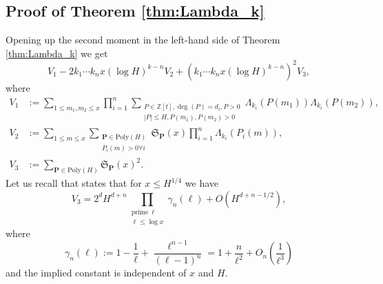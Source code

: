 \documentclass[reqno, 11pt]{amsart}
\numberwithin{equation}{section}
\theoremstyle{definition}
\newcommand{\0}{\mathbf{0}}
\renewcommand{\leq}{\leqslant}
\renewcommand{\leq}{\leqslant}
\renewcommand{\#}{\sharp}
\begin{document}
\subsection{Proof of Theorem \ref{thm:Lambda_k}} \label{proofmaintheorem} Opening up the second moment in the  left-hand side of 
Theorem \ref{thm:Lambda_k} we get \begin{equation}\label{eq:karotsaki} V_1-2k_1\cdots k_n x (\log H)^{k-n}    
V_2 +(k_1\cdots k_n x (\log H)^{k-n})^2 V_3 ,  \end{equation} where \begin{align*}
V_1& := \sum_{1\leq m_1,m_2\leq x } \prod_{i=1}^n  \sum_{\substack{P \in \mathbb Z[t], \deg(P)=d_i,P>0
 \\|P|\leq H, P(m_1),P(m_2)>0 }}  \Lambda_{k_i}(P(m_1)) \Lambda_{k_i}(P(m_2)), \\
V_2& :=  \sum_{1\leq m\leq x } \sum_{\substack{\mathbf P \in  \textrm{Poly}(H)
\\ P_i(m)>0 \forall i  }}  \mathfrak S_{\mathbf P }(x) \prod_{i=1}^n \Lambda_{k_i}(P_i(m)) , \\
V_3& := \sum_{\mathbf P \in  \textrm{Poly}(H)} \mathfrak S_{\mathbf P }(x)^2.\end{align*} 
Let us   recall that \cite[Lemma 4.7]{MR4542704} states that  for  $ x \leqslant H^{1/4}$ we have
\begin{equation}\label{lem:ch'io muti consiglio", Guglielmo}V_3 = 2^d H^{d+n}  \prod_{\substack{\mathrm{prime } \ \ell 
\\  \ell \leq \log x}}  \gamma_n(\ell) + O(H^{d+n-1/2}),\end{equation} where $$
\gamma_n(\ell) := 1 - \frac{1}{\ell} + \frac{\ell^{n-1}}{(\ell - 1)^n}=1+\frac{n}{\ell^2}
+O_n\left( \frac{1}{\ell^3}  \right) $$  and the implied constant  is independent  of $x$ and $H$. 
\end{document}
